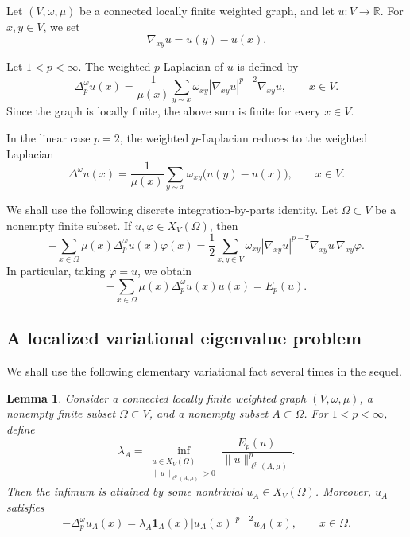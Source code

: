 \documentclass[twoside,12pt,letter]{article}
\theoremstyle{plain}
\newtheorem{lemma}[theorem]{Lemma}
\theoremstyle{definition}
\theoremstyle{remark}
\numberwithin{equation}{section}
\begin{document}
Let \((V,\omega,\mu)\) be a connected locally finite weighted graph, and let
\(u:V\to\mathbb{R}\). For \(x,y\in V\), we set
\[
\nabla_{xy}u=u(y)-u(x).
\]

Let \(1<p<\infty\). The weighted \(p\)-Laplacian of \(u\) is defined by
\[
\Delta_p^\omega u(x)
=
\frac{1}{\mu(x)}
\sum_{y\sim x}
\omega_{xy}|\nabla_{xy}u|^{p-2}\nabla_{xy}u,
\qquad x\in V.
\]
Since the graph is locally finite, the above sum is finite for every \(x\in V\).

In the linear case \(p=2\), the weighted \(p\)-Laplacian reduces to the weighted
Laplacian
\[
\Delta^\omega u(x)
=
\frac{1}{\mu(x)}
\sum_{y\sim x}
\omega_{xy}\bigl(u(y)-u(x)\bigr),
\qquad x\in V.
\]

We shall use the following discrete integration-by-parts identity. Let
\(\Omega\subset V\) be a nonempty finite subset. If
\(u,\varphi\in X_V(\Omega)\), then
\[
-\sum_{x\in\Omega}\mu(x)\Delta_p^\omega u(x)\varphi(x)
=
\frac12
\sum_{x,y\in V}
\omega_{xy}
|\nabla_{xy}u|^{p-2}\nabla_{xy}u\,\nabla_{xy}\varphi.
\]
In particular, taking \(\varphi=u\), we obtain
\[
-\sum_{x\in\Omega}\mu(x)\Delta_p^\omega u(x)u(x)
=
E_p(u).
\]

\subsection{A localized variational eigenvalue problem}

We shall use the following elementary variational fact several times in the
sequel.

\begin{lemma}\label{lem-variational-localized-eigenvalue}
Consider a connected locally finite weighted graph \((V,\omega,\mu)\), a
nonempty finite subset \(\Omega\subset V\), and a nonempty subset
\(A\subset\Omega\). For \(1<p<\infty\), define
\[
\lambda_A
=
\inf_{\substack{u\in X_V(\Omega)\\
\|u\|_{\ell^p(A,\mu)}>0}}
\frac{E_p(u)}
{\|u\|_{\ell^p(A,\mu)}^p}.
\]
Then the infimum is attained by some nontrivial \(u_A\in X_V(\Omega)\).
Moreover, \(u_A\) satisfies
\[
-\Delta_p^\omega u_A(x)
=
\lambda_A\mathbf{1}_A(x)|u_A(x)|^{p-2}u_A(x),
\qquad x\in\Omega.
\]
\end{lemma}
\end{document}
